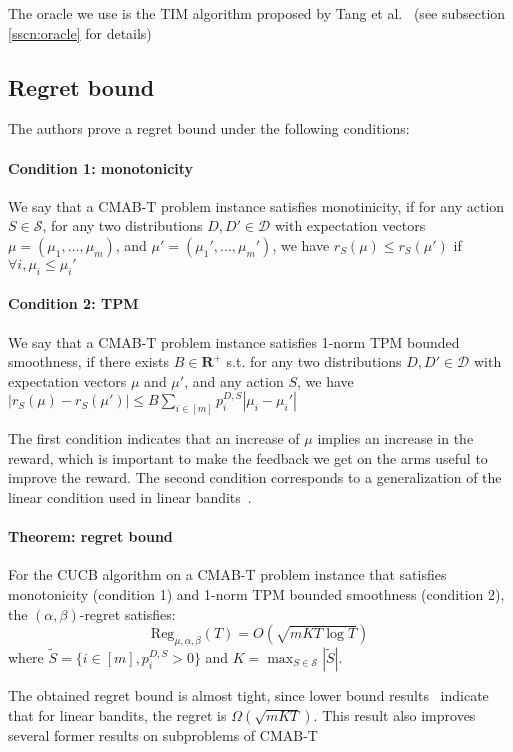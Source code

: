 \documentclass[a4paper,12pt]{article}
\begin{document}
The oracle we use is the TIM algorithm proposed by Tang et al.~\cite{tang2014influence} (see subsection \ref{sscn:oracle} for details)

\subsection{Regret bound}

The authors prove a regret bound under the following conditions: 
\paragraph{Condition 1: monotonicity}
We say that a CMAB-T problem instance satisfies monotinicity, if for any action $S\in\mathcal{S}$, for any two distributions $D, D'\in\mathcal{D}$ with expectation vectors $\mu = (\mu_1, ..., \mu_m)$, and $\mu' = (\mu_1', ..., \mu_m')$, we have $r_S(\mu) \leq r_S(\mu')$ if $\forall i, \mu_i\leq \mu_i'$

\paragraph{Condition 2: TPM}
We say that a CMAB-T problem instance satisfies 1-norm TPM bounded smoothness, if there exists $B\in\mathbf{R}^+$ s.t. for any two distributions $D, D'\in\mathcal{D}$ with expectation vectors $\mu$ and $\mu'$, and any action $S$, we have $|r_S(\mu)-r_S(\mu')| \leq B\sum_{i\in[m]}p_i^{D,S} |\mu_i-\mu_i'|$

The first condition indicates that an increase of $\mu$ implies an increase in the reward, which is important to make the feedback we get on the arms useful to improve the reward. The second condition corresponds to a generalization of the linear condition used in linear bandits~\cite{kveton2015tight}.

\paragraph{Theorem: regret bound}
For the CUCB algorithm on a CMAB-T problem instance that satisfies monotonicity (condition 1) and 1-norm TPM bounded smoothness (condition 2), the $(\alpha, \beta)$-regret satisfies:
\begin{equation}
 \text{Reg}_{\mu, \alpha, \beta}(T) = O(\sqrt{mKT\log T})
\end{equation}
where $\tilde{S} = \{i\in[m], p_i^{D, S} > 0\}$ and $K = \max_{S\in\mathcal{S}}|\tilde{S}|$.

The obtained regret bound is almost tight, since lower bound results~\cite{kveton2015tight} indicate that for linear bandits, the regret is $\Omega(\sqrt{mKT})$. This result also improves several former results on subproblems of CMAB-T~\cite{chen2016combinatorial,kveton2015tight,kveton2015combinatorial,wen2016online}
\end{document}
